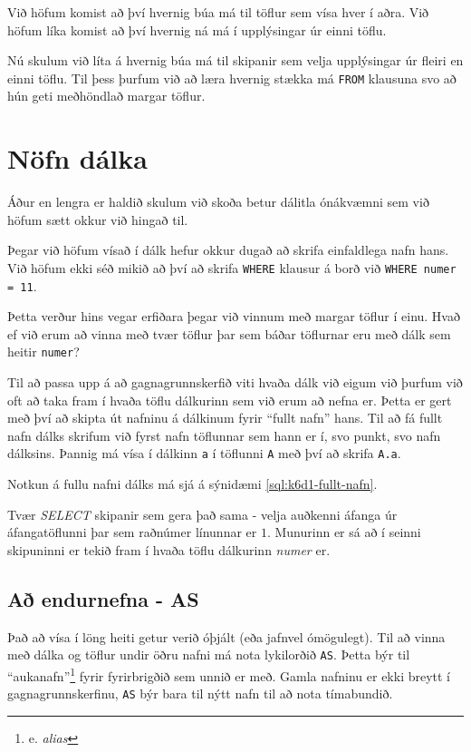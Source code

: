 Við höfum komist að því hvernig búa má til töflur sem vísa hver í aðra. Við höfum líka komist að því hvernig ná má í upplýsingar úr einni töflu.

Nú skulum við líta á hvernig búa má til skipanir sem velja upplýsingar úr fleiri en einni töflu. Til þess þurfum við að læra hvernig stækka má \verb|FROM| klausuna svo að hún geti meðhöndlað margar töflur.
\section{Nöfn dálka}
Áður en lengra er haldið skulum við skoða betur dálitla ónákvæmni sem við höfum sætt okkur við hingað til.

Þegar við höfum vísað í dálk hefur okkur dugað að skrifa einfaldlega nafn hans. Við höfum ekki séð mikið að því að skrifa \verb|WHERE| klausur á borð við \verb|WHERE numer = 11|.

Þetta verður hins vegar erfiðara þegar við vinnum með margar töflur í einu. Hvað ef við erum að vinna með tvær töflur þar sem báðar töflurnar eru með dálk sem heitir \verb|numer|?

Til að passa upp á að gagnagrunnskerfið viti hvaða dálk við eigum við þurfum við oft að taka fram í hvaða töflu dálkurinn sem við erum að nefna er. Þetta er gert með því að skipta út nafninu á dálkinum fyrir ``fullt nafn'' hans. Til að fá fullt nafn dálks skrifum við fyrst nafn töflunnar sem hann er í, svo punkt, svo nafn dálksins. Þannig má vísa í dálkinn \verb|a| í töflunni \verb|A| með því að skrifa \verb|A.a|.

Notkun á fullu nafni dálks má sjá á sýnidæmi \ref{sql:k6d1-fullt-nafn}.

\begin{example}
\caption[Fullt nafn dálks]{Tvær \emph{SELECT} skipanir sem gera það sama - velja auðkenni áfanga úr áfangatöflunni þar sem raðnúmer línunnar er $1$. Munurinn er sá að í seinni skipuninni er tekið fram í hvaða töflu dálkurinn \emph{numer} er.}
\label{sql:k6d1-fullt-nafn}
\centering
{}
\end{example}

\subsection{Að endurnefna - AS}
Það að vísa í löng heiti getur verið óþjált (eða jafnvel ómögulegt). Til að vinna með dálka og töflur undir öðru nafni má nota lykilorðið \verb|AS|. Þetta býr til ``aukanafn''\footnote{e. \emph{alias}} fyrir fyrirbrigðið sem unnið er með. Gamla nafninu er ekki breytt í gagnagrunnskerfinu, \verb|AS| býr bara til nýtt nafn til að nota tímabundið.

